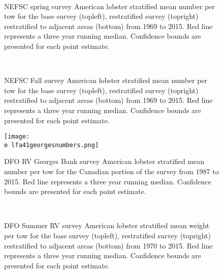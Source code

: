 \documentclass[11pt]{article}
\newcommand{\e}{/backup/bio_data/bio.lobster/figures/}
\begin{document}
\begin{figure}
\centering
{}
\\
\caption{NEFSC spring survey American lobster stratified mean number per tow for the base survey (topleft), restratified survey (topright) restratified to adjacent areas (bottom) from 1969 to 2015. Red line represents a three year running median. Confidence bounds are presented for each point estimate. }
\end{figure}
\clearpage


\begin{figure}
\centering
{}
\\
\caption{NEFSC Fall survey American lobster stratified mean number per tow for the base survey (topleft), restratified survey (topright) restratified to adjacent areas (bottom) from 1969 to 2015. Red line represents a three year running median. Confidence bounds are presented for each point estimate. }
\end{figure}
\clearpage

\begin{figure}

    \texttt{[image: \\e lfa41georgesnumbers.png]}
    \caption{DFO RV Georges Bank survey American lobster stratified mean number per tow for the Canadian portion of the survey from 1987 to 2015. Red line represents a three year running median. Confidence bounds are presented for each point estimate.}

\end{figure}


\begin{figure}
\centering
{}
\\
\caption{DFO Summer RV survey American lobster stratified mean weight per tow for the base survey (topleft), restratified survey (topright) restratified to adjacent areas (bottom) from 1970 to 2015. Red line represents a three year running median. Confidence bounds are presented for each point estimate.}
\end{figure}
\clearpage
\end{document}
